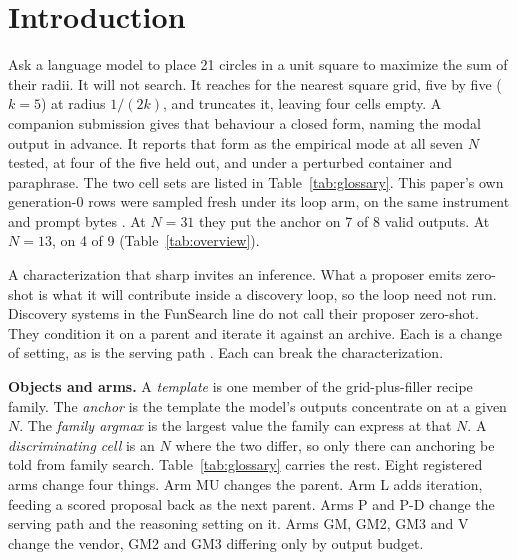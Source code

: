 \section{Introduction}\label{sec:intro}

Ask a language model to place 21 circles in a unit square to maximize the sum of their radii.
It will not search. It reaches for the nearest square grid, five by five ($k = 5$) at
radius $1/(2k)$, and truncates it, leaving four cells empty. A companion submission
\citep{companion} gives that behaviour a closed form, naming the modal output in advance.
It reports that form as the empirical mode at all seven $N$ tested, at four of the five
held out, and under a perturbed container and paraphrase. The two cell sets are listed in
Table~\ref{tab:glossary}. This paper's own generation-0 rows were sampled
fresh under its loop arm, on the same instrument and prompt bytes
\citep{companion}. At $N = 31$ they put the anchor on 7 of 8 valid
outputs. At $N = 13$, on 4 of 9 (Table~\ref{tab:overview}).

A characterization that sharp invites an inference. What a proposer emits zero-shot is what it
will contribute inside a discovery loop, so the loop need not run. Discovery systems in the
FunSearch line \citep{romeraparedes2024funsearch,novikov2025alphaevolve} do not call their
proposer zero-shot. They condition it on a parent and iterate it against an archive. Each is a
change of setting, as is the serving path \citep{companion}. Each can break the
characterization.

\textbf{Objects and arms.} A \emph{template} is one
member of the grid-plus-filler recipe family. The \emph{anchor} is the template the model's
outputs concentrate on at a given $N$. The \emph{family argmax} is the largest value the
family can express at that $N$. A \emph{discriminating cell} is an $N$ where the two differ,
so only there can anchoring be told from family search. Table~\ref{tab:glossary} carries the
rest. Eight registered arms change four things. Arm MU changes
the parent. Arm L adds iteration, feeding a scored proposal back as the next parent. Arms P
and P-D change the serving path and the reasoning setting on it. Arms GM, GM2, GM3 and V
change the vendor, GM2 and GM3 differing only by output budget.

